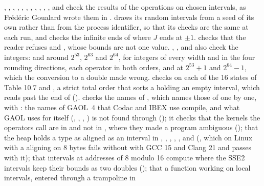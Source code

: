 \documentclass[12pt,a4paper,twoside,openright]{book}
\begin{document}
, , ,
, , ,
, , ,
, ,  and
 check the results of the operations on chosen
intervals, as Fr\'ed\'eric Goualard wrote them in .
 draws its random intervals from a seed of its own
rather than from the process identifier, so that its checks are the same at
each run, and checks the infinite ends of  where $J$
ends at $\pm1$.\newinvfive{}  checks that the reader
refuses  and , whose bounds are not one
value. , , 
and  also check the integers:  and
 around $2^{53}$, $2^{63}$ and $2^{64}$, for integers of
every width and in the four rounding directions, each operator in both
orders, and  at $2^{53}+1$ and $2^{64}-1$, which the
conversion to a double made wrong.\newinvfive{}  checks
 on each of the 16 states of Table 10.7 and
, a strict total order that sorts a
 holding an empty interval, which \code{<} reads past the
end of ().\newinvfive{}  checks the
names of , which names those of  one by one,
with : the names of GAOL~4 that Codac and IBEX use
compile, and what GAOL uses for itself (,
, , ) is not
found through  (); it
checks that the kernels the operators call are in  and
not in , where they made a program ambiguous
(); that the heap
holds a type
as aligned as an interval in , ,
, , ,  and
 (, which on Linux with a
 aligning on 8 bytes fails without
 with GCC 15 and Clang 21 and passes with it); that
intervals at addresses of 8 modulo 16 compute where the SSE2 intervals keep
their bounds as two doubles ();
that a function working on local intervals, entered through a trampoline in
\end{document}
